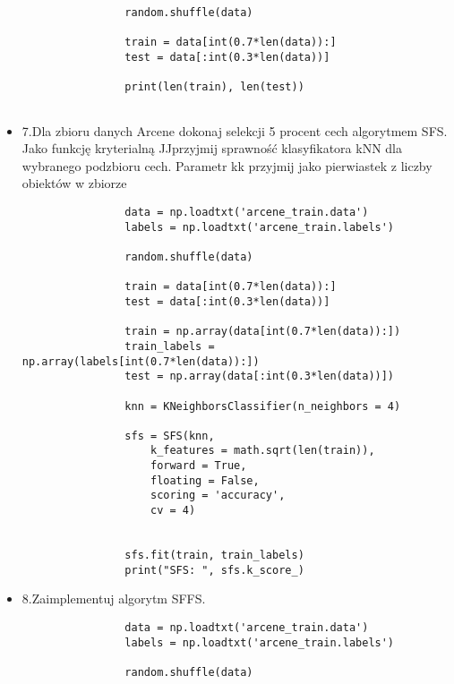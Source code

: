 \documentclass[12pt,a4paper]{article}
\begin{document}
\begin{itemize}
\begin{lstlisting}
                random.shuffle(data)
                 
                train = data[int(0.7*len(data)):]
                test = data[:int(0.3*len(data))]
                
                print(len(train), len(test))
                
	\end{lstlisting}
                \clearpage

                        \item 7.Dla zbioru danych Arcene dokonaj selekcji 5 procent cech algorytmem SFS. Jako funkcję kryterialną JJprzyjmij sprawność klasyfikatora kNN dla wybranego podzbioru cech. Parametr kk przyjmij jako pierwiastek z liczby obiektów w zbiorze

	\begin{lstlisting}
                data = np.loadtxt('arcene_train.data')
                labels = np.loadtxt('arcene_train.labels')
                 
                random.shuffle(data)
                 
                train = data[int(0.7*len(data)):]
                test = data[:int(0.3*len(data))]
                 
                train = np.array(data[int(0.7*len(data)):])
                train_labels = np.array(labels[int(0.7*len(data)):])
                test = np.array(data[:int(0.3*len(data))])
                 
                knn = KNeighborsClassifier(n_neighbors = 4)
                 
                sfs = SFS(knn,
                    k_features = math.sqrt(len(train)),
                    forward = True,
                    floating = False,
                    scoring = 'accuracy',
                    cv = 4)
                 
                
                sfs.fit(train, train_labels)
                print("SFS: ", sfs.k_score_)
	\end{lstlisting}
		
                \clearpage

                \item 8.Zaimplementuj algorytm SFFS.
	\begin{lstlisting}
                data = np.loadtxt('arcene_train.data')
                labels = np.loadtxt('arcene_train.labels')
                 
                random.shuffle(data)
                 

\end{lstlisting}
\end{itemize}
\end{document}

